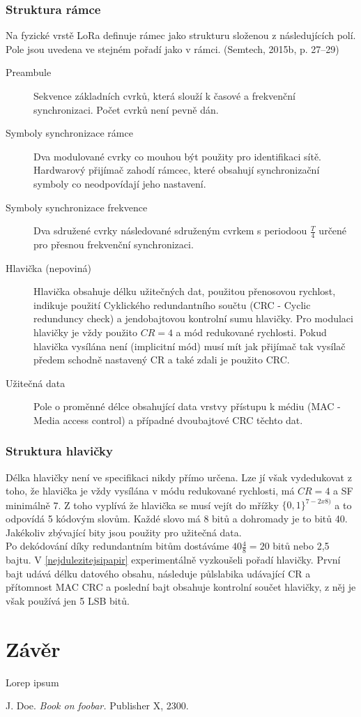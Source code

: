 \documentclass{ctuthesis}
\begin{document}
\subsection{Struktura rámce}
Na fyzické vrstě LoRa definuje rámec jako strukturu složenou z následujících polí. Pole jsou uvedena ve stejném pořadí jako v rámci.  (Semtech, 2015b, p. 27–29)
\begin{description}
\item[Preambule]
Sekvence základních cvrků, která slouží k časové a frekvenční synchronizaci. Počet cvrků není pevně dán.
\item[Symboly synchronizace rámce]
Dva modulované cvrky co mouhou být použity pro identifikaci sítě. Hardwarový přijímač zahodí rámcec, které obsahují synchronizační symboly co neodpovídají jeho nastavení.
\item[Symboly synchronizace frekvence]
Dva sdružené cvrky následované sdruženým cvrkem s periodoou $\frac{T}{4}$ určené pro přesnou frekvenční synchronizaci.
\item[Hlavička (nepoviná)]
Hlavička obsahuje délku užitečných dat, použitou přenosovou rychlost, indikuje použití Cyklického redundantního součtu (CRC - Cyclic redunduncy check) a jendobajtovou kontrolní sumu hlavičky. Pro modulaci hlavičky je vždy použito $CR =4$ a mód redukované rychlosti. Pokud hlavička vysílána není (implicitní mód) musí mít jak přijímač tak vysílač předem schodně nastavený CR a také zdali je použito CRC.
\item[Užitečná data]
Pole o proměnné délce obsahující data vrstvy přístupu k médiu (MAC - Media access control) a případné dvoubajtové CRC těchto dat.
\end{description}
\subsection{Struktura hlavičky}
Délka hlavičky není ve specifikaci nikdy přímo určena. Lze jí však vydedukovat z toho, že hlavička je vždy vysílána v módu redukované rychlosti, má $CR =4$ a SF minimálně 7. Z toho vyplívá že hlavička se musí vejít do mřížky $\{0,1\}^{7-2 x 8)}$ a to odpovídá 5 kódovým slovům. Každé slovo má 8 bitů a dohromady je to bitů 40. Jakékoliv zbývající bity jsou použity pro užitečná data. \\
Po dekódování díky redundantním bitům dostáváme $40\frac{4}{8} = 20$ bitů nebo 2,5 bajtu. V \ref{nejdulezitejsipapir} experimentálně vyzkoušeli pořadí hlavičky. První bajt udává délku datového obsahu, následuje půlslabika  udávající CR a přítomnost MAC CRC a poslední bajt obsahuje kontrolní součet hlavičky, z něj je však používá jen 5 LSB bitů.


\chapter{Závěr}

Lorep ipsum \cite{doe}

\begin{thebibliography}{1}

 J. Doe. \emph{Book on foobar.} Publisher X,
 2300.

\end{thebibliography}
\end{document}
